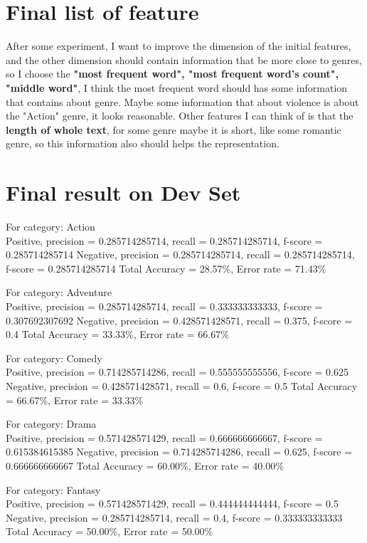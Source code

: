 \documentclass{article}
\begin{document}
\section{Final list of feature}

After some experiment, I want to improve the dimension of the initial features, and the other dimension should contain information that be more close to genres, so I choose the \textbf{"most frequent word", "most frequent word's count", "middle word"}, I think the most frequent word should has some information that contains about genre. Maybe some information that about violence is about the "Action" genre, it looks reasonable. Other features I can think of is that the \textbf{length of whole text}, for some genre maybe it is short, like some romantic genre, so this information also should helps the representation. 

\section{Final result on Dev Set}
For category: Action ~\\
Positive, precision = 0.285714285714, recall = 0.285714285714, f-score = 0.285714285714 
Negative, precision = 0.285714285714, recall = 0.285714285714, f-score = 0.285714285714 
Total Accuracy = 28.57\%, Error rate = 71.43\%

For category: Adventure ~\\
Positive, precision = 0.285714285714, recall = 0.333333333333, f-score = 0.307692307692 
Negative, precision = 0.428571428571, recall = 0.375, f-score = 0.4 
Total Accuracy = 33.33\%, Error rate = 66.67\%

For category: Comedy ~\\
Positive, precision = 0.714285714286, recall = 0.555555555556, f-score = 0.625 
Negative, precision = 0.428571428571, recall = 0.6, f-score = 0.5 
Total Accuracy = 66.67\%, Error rate = 33.33\%

For category: Drama ~\\
Positive, precision = 0.571428571429, recall = 0.666666666667, f-score = 0.615384615385 
Negative, precision = 0.714285714286, recall = 0.625, f-score = 0.666666666667 
Total Accuracy = 60.00\%, Error rate = 40.00\%

For category: Fantasy ~\\
Positive, precision = 0.571428571429, recall = 0.444444444444, f-score = 0.5 
Negative, precision = 0.285714285714, recall = 0.4, f-score = 0.333333333333 
Total Accuracy = 50.00\%, Error rate = 50.00\%
\end{document}
